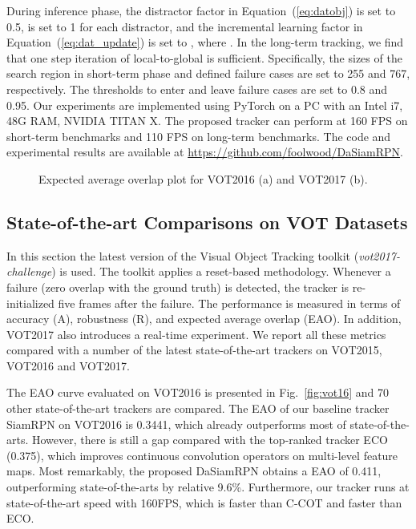 \documentclass[runningheads]{llncs}
\begin{document}
During inference phase, the distractor factor  in Equation~(\ref{eq:datobj}) is set to 0.5,  is set to 1 for each distractor, and the incremental learning factor  in Equation~(\ref{eq:dat_update}) is set to , where . In the long-term tracking, we find that one step iteration of local-to-global is sufficient. Specifically, the sizes of the search region in short-term phase and defined failure cases are set to 255 and 767, respectively. The thresholds to enter and leave failure cases are set to 0.8 and 0.95.
Our experiments are implemented using PyTorch on a PC with an Intel i7, 48G RAM, NVIDIA TITAN X. The proposed tracker can perform at 160 FPS on short-term benchmarks and 110 FPS on long-term benchmarks. The code and experimental results are available at \url{https://github.com/foolwood/DaSiamRPN}.

\begin{figure}[t]
\centering
{}
\caption{Expected average overlap plot for VOT2016 (a) and VOT2017 (b).}
\label{fig_vot}

\end{figure}


\subsection{State-of-the-art Comparisons on VOT Datasets}

\label{sect:vot}

In this section the latest version of the Visual Object Tracking toolkit (\emph{vot2017-challenge}) is used. The toolkit applies a reset-based methodology. Whenever a failure (zero overlap with the ground truth) is detected, the tracker is re-initialized five frames after the failure. The performance is measured in terms of accuracy (A), robustness (R), and expected average overlap (EAO). In addition, VOT2017 also introduces a real-time experiment. We report all these metrics compared with a number of the latest state-of-the-art trackers on VOT2015, VOT2016 and VOT2017.

The EAO curve evaluated on VOT2016 is presented in Fig.~\ref{fig:vot16} and 70 other state-of-the-art trackers are compared. The EAO of our baseline tracker SiamRPN on VOT2016 is 0.3441, which already outperforms most of state-of-the-arts. However, there is still a gap compared with the top-ranked tracker ECO (0.375), which improves continuous convolution operators on multi-level feature maps. Most remarkably, the proposed DaSiamRPN obtains a EAO of 0.411, outperforming state-of-the-arts by relative 9.6\%. Furthermore, our tracker runs at state-of-the-art speed with 160FPS, which is  faster than C-COT and  faster than ECO.
\end{document}
